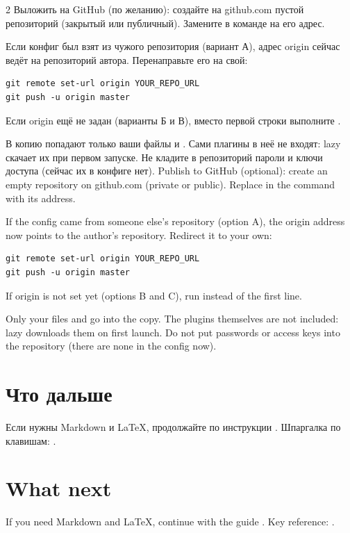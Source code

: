 \begin{paracol}{2}
\RU
Выложить на GitHub (по желанию): создайте на github.com пустой репозиторий (закрытый или публичный). Замените в команде  на его адрес.

Если конфиг был взят из чужого репозитория (вариант А), адрес origin сейчас ведёт на репозиторий автора. Перенаправьте его на свой:
\begin{lstlisting}
git remote set-url origin YOUR_REPO_URL
git push -u origin master
\end{lstlisting}
Если origin ещё не задан (варианты Б и В), вместо первой строки выполните .

В копию попадают только ваши файлы и . Сами плагины в неё не входят: lazy скачает их при первом запуске. Не кладите в репозиторий пароли и ключи доступа (сейчас их в конфиге нет).
\switchcolumn
\EN
Publish to GitHub (optional): create an empty repository on github.com (private or public). Replace  in the command with its address.

If the config came from someone else's repository (option A), the origin address now points to the author's repository. Redirect it to your own:
\begin{lstlisting}
git remote set-url origin YOUR_REPO_URL
git push -u origin master
\end{lstlisting}
If origin is not set yet (options B and C), run  instead of the first line.

Only your files and  go into the copy. The plugins themselves are not included: lazy downloads them on first launch. Do not put passwords or access keys into the repository (there are none in the config now).
\switchcolumn*

\RU
\section*{Что дальше}
Если нужны Markdown и LaTeX, продолжайте по инструкции . Шпаргалка по клавишам: .
\switchcolumn
\EN
\section*{What next}
If you need Markdown and LaTeX, continue with the guide . Key reference: .
\end{paracol}


